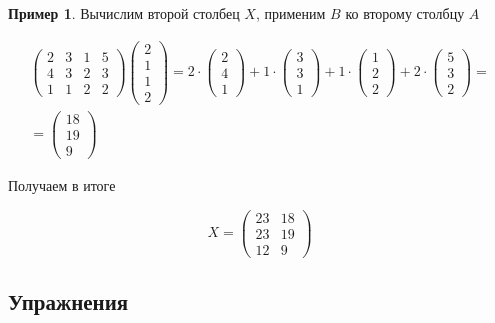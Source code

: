 \documentclass[]{article}
\theoremstyle{theorem}
\theoremstyle{definition}
\newtheorem{ex}{Пример}
\begin{document}
\begin{ex}
Вычислим второй столбец $X$, применим $B$ ко второму столбцу $A$

\begin{equation*}
	\begin{gathered}
		\begin{pmatrix}
			2&3&1&5\\
			4&3&2&3\\
			1&1&2&2
		\end{pmatrix}
		\begin{pmatrix}
			2\\
			1\\
			1\\
			2
		\end{pmatrix}
		=
		2
		\cdot
		\begin{pmatrix}
			2\\
			4\\
			1
		\end{pmatrix}
		+
		1
		\cdot
		\begin{pmatrix}
			3\\
			3\\
			1
		\end{pmatrix}
		+
		1
		\cdot
		\begin{pmatrix}
			1\\
			2\\
			2
		\end{pmatrix}
		+
		2
		\cdot
		\begin{pmatrix}
			5\\
			3\\
			2
		\end{pmatrix}
		=
		\\
		=
		\begin{pmatrix}
			18\\
			19\\
			9
		\end{pmatrix}
	\end{gathered}
\end{equation*}

Получаем в итоге

\begin{equation*}
	X
	=
\begin{pmatrix}
	23&18\\
	23&19\\
	12&9
\end{pmatrix}
\end{equation*}
\end{ex}

\subsection{Упражнения}
\end{document}
